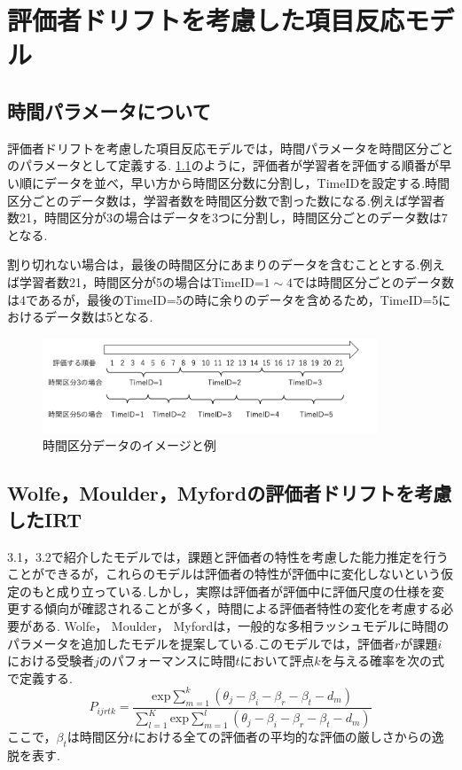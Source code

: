 \documentclass[a4paper，11pt，oneside，openany]{jsbook}
\begin{document}
\chapter{評価者ドリフトを考慮した項目反応モデル}
\section{時間パラメータについて}
評価者ドリフトを考慮した項目反応モデルでは，時間パラメータを時間区分ごとのパラメータとして定義する.
\ref{timeid}のように，評価者が学習者を評価する順番が早い順にデータを並べ，早い方から時間区分数に分割し，TimeIDを設定する.時間区分ごとのデータ数は，学習者数を時間区分数で割った数になる.例えば学習者数21，時間区分が3の場合はデータを3つに分割し，時間区分ごとのデータ数は7となる.

割り切れない場合は，最後の時間区分にあまりのデータを含むこととする.例えば学習者数21，時間区分が5の場合はTimeID=$1\sim4$では時間区分ごとのデータ数は4であるが，最後のTimeID=5の時に余りのデータを含めるため，TimeID=5におけるデータ数は5となる.
\begin{figure}[ht]
 \centering
\includegraphics[width=10cm]{img/timeid.png}
\caption{時間区分データのイメージと例}
 \label{timeid}
\end{figure}


\section{Wolfe，Moulder，Myfordの評価者ドリフトを考慮したIRT}
3.1，3.2で紹介したモデルでは，課題と評価者の特性を考慮した能力推定を行うことができるが，これらのモデルは評価者の特性が評価中に変化しないという仮定のもと成り立っている.しかし，実際は評価者が評価中に評価尺度の仕様を変更する傾向が確認されることが多く，時間による評価者特性の変化を考慮する必要がある.
Wolfe， Moulder， Myfordは，一般的な多相ラッシュモデルに時間のパラメータを追加したモデルを提案している\cite{raterdrift}.このモデルでは，評価者$r$が課題$i$における受験者$j$のパフォーマンスに時間$t$において評点$k$を与える確率を次の式で定義する.
\begin{displaymath}
P_{ijrtk}=\frac{\mathrm{exp}\sum_{m=1}^{k}(\theta_{j}-\beta_{i}-\beta_{r}-\beta_{t}-d_{m})}{\sum_{l=1}^{K}\mathrm{exp}\sum_{m=1}^{l}(\theta_{j}-\beta_{i}-\beta_{r}-\beta_{t}-d_{m})}
\end{displaymath}
ここで，$\beta_t$は時間区分$t$における全ての評価者の平均的な評価の厳しさからの逸脱を表す.
\end{document}
